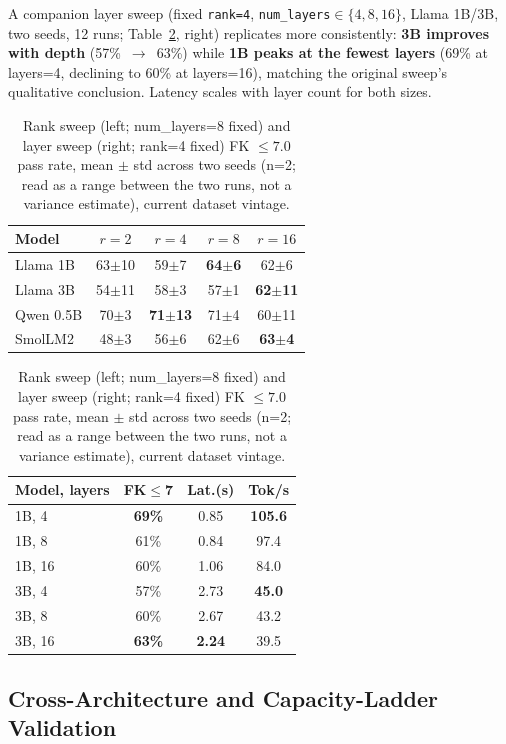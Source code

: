\documentclass[pdflatex,sn-mathphys-num]{sn-jnl-official}%
\begin{document}
A companion layer sweep (fixed \texttt{rank=4}, \texttt{num\_layers}$\in\{4,8,16\}$, Llama 1B/3B, two seeds, 12 runs; Table~\ref{tab:sweeps}, right) replicates more consistently: \textbf{3B improves with depth} (57\%~$\to$~63\%) while \textbf{1B peaks at the fewest layers} (69\% at layers=4, declining to 60\% at layers=16), matching the original sweep's qualitative conclusion. Latency scales with layer count for both sizes.

\begin{table}[!h]
  \centering
  \caption{Rank sweep (left; num\_layers=8 fixed) and layer sweep (right; rank=4 fixed) FK $\leq 7.0$ pass rate, mean $\pm$ std across two seeds (n=2; read as a range between the two runs, not a variance estimate), current dataset vintage.}
  \label{tab:sweeps}
  \scriptsize
  \setlength{\tabcolsep}{3pt}
  \begin{tabular}{@{}lcccc@{}}
    \toprule
    Model     & $r{=}2$ & $r{=}4$ & $r{=}8$ & $r{=}16$ \\
    \midrule
    Llama 1B  & 63$\pm$10 & 59$\pm$7 & \textbf{64$\pm$6} & 62$\pm$6 \\
    Llama 3B  & 54$\pm$11 & 58$\pm$3 & 57$\pm$1 & \textbf{62$\pm$11} \\
    Qwen 0.5B & 70$\pm$3 & \textbf{71$\pm$13} & 71$\pm$4 & 60$\pm$11 \\
    SmolLM2   & 48$\pm$3 & 56$\pm$6 & 62$\pm$6 & \textbf{63$\pm$4} \\
    \bottomrule
  \end{tabular}
  \qquad
  \begin{tabular}{@{}lccc@{}}
    \toprule
    Model, layers & FK$\leq$7 & Lat.(s) & Tok/s \\
    \midrule
    1B, 4  & \textbf{69\%} & 0.85 & \textbf{105.6} \\
    1B, 8  & 61\% & 0.84 & 97.4 \\
    1B, 16 & 60\% & 1.06 & 84.0 \\
    3B, 4  & 57\% & 2.73 & \textbf{45.0} \\
    3B, 8  & 60\% & 2.67 & 43.2 \\
    3B, 16 & \textbf{63\%} & \textbf{2.24} & 39.5 \\
    \bottomrule
  \end{tabular}
\end{table}

\subsection{Cross-Architecture and Capacity-Ladder Validation}\label{sec:crossarch}
\end{document}
